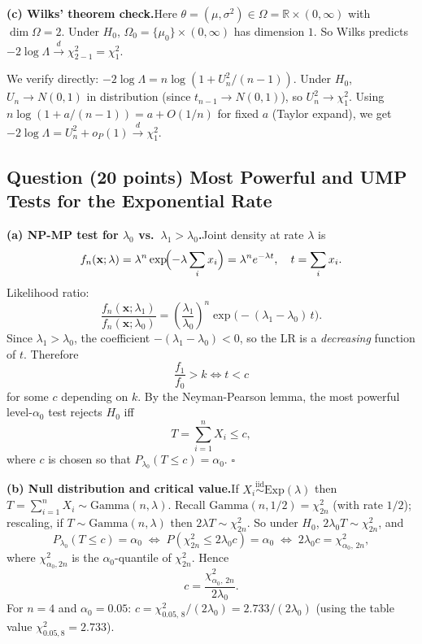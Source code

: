 \documentclass[11pt]{article}
\newcounter{qnum}
\newcommand{\question}[2]{\stepcounter{qnum}\subsection*{Question \theqnum \quad (#1 points) \hfill #2}}
\begin{document}
\medskip

\textbf{(c) Wilks' theorem check.}\quad Here $\theta = (\mu,\sigma^2) \in \Omega = \mathbb{R}\times(0,\infty)$ with $\dim\Omega = 2$. Under $H_0$, $\Omega_0 = \{\mu_0\}\times(0,\infty)$ has dimension $1$. So Wilks predicts $-2\log\Lambda \xrightarrow{d}\chi^2_{2-1} = \chi^2_1$.

We verify directly: $-2\log\Lambda = n\log(1 + U_n^2/(n-1))$. Under $H_0$, $U_n \to N(0,1)$ in distribution (since $t_{n-1} \to N(0,1)$), so $U_n^2 \to \chi^2_1$. Using $n\log(1 + a/(n-1)) = a + O(1/n)$ for fixed $a$ (Taylor expand), we get $-2\log\Lambda = U_n^2 + o_P(1) \xrightarrow{d}\chi^2_1$. \quad\checkmark

\question{20}{Most Powerful and UMP Tests for the Exponential Rate}

\textbf{(a) NP-MP test for $\lambda_0$ vs.\ $\lambda_1 > \lambda_0$.}\quad Joint density at rate $\lambda$ is
\[
f_n(\mathbf{x};\lambda) = \lambda^n \exp\!\Bigl(-\lambda \sum_i x_i\Bigr) = \lambda^n e^{-\lambda t},\quad t = \sum_i x_i.
\]
Likelihood ratio:
\[
\frac{f_n(\mathbf{x};\lambda_1)}{f_n(\mathbf{x};\lambda_0)} = \left(\frac{\lambda_1}{\lambda_0}\right)^n \exp\!\bigl(-(\lambda_1-\lambda_0)\,t\bigr).
\]
Since $\lambda_1 > \lambda_0$, the coefficient $-(\lambda_1-\lambda_0) < 0$, so the LR is a \emph{decreasing} function of $t$. Therefore
\[
\frac{f_1}{f_0} > k \iff t < c
\]
for some $c$ depending on $k$. By the Neyman-Pearson lemma, the most powerful level-$\alpha_0$ test rejects $H_0$ iff
\[
T = \sum_{i=1}^n X_i \le c,
\]
where $c$ is chosen so that $P_{\lambda_0}(T \le c) = \alpha_0$. \hfill$\square$

\medskip

\textbf{(b) Null distribution and critical value.}\quad If $X_i \stackrel{\text{iid}}{\sim}\mathrm{Exp}(\lambda)$ then $T = \sum_{i=1}^n X_i \sim \mathrm{Gamma}(n,\lambda)$. Recall $\mathrm{Gamma}(n,1/2) = \chi^2_{2n}$ (with rate $1/2$); rescaling, if $T \sim \mathrm{Gamma}(n,\lambda)$ then $2\lambda T \sim \chi^2_{2n}$. So under $H_0$, $2\lambda_0 T \sim \chi^2_{2n}$, and
\[
P_{\lambda_0}(T \le c) = \alpha_0 \;\iff\; P(\chi^2_{2n} \le 2\lambda_0 c) = \alpha_0 \;\iff\; 2\lambda_0 c = \chi^2_{\alpha_0,\,2n},
\]
where $\chi^2_{\alpha_0, 2n}$ is the $\alpha_0$-quantile of $\chi^2_{2n}$. Hence
\[
\boxed{\;c = \frac{\chi^2_{\alpha_0,\,2n}}{2\lambda_0}.\;}
\]
For $n = 4$ and $\alpha_0 = 0.05$: $c = \chi^2_{0.05,\,8}/(2\lambda_0) = 2.733/(2\lambda_0)$ (using the table value $\chi^2_{0.05,8} = 2.733$).

\medskip
\end{document}
